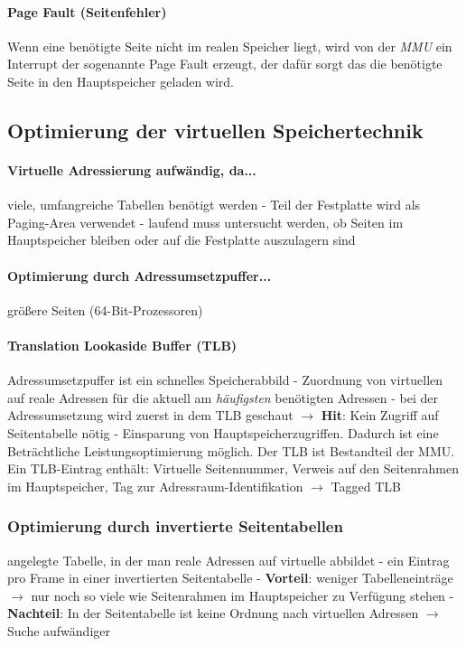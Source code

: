 \documentclass[11pt,a4paper,landscape]{article}
\begin{document}
\begin{multicols*}{3}
	\paragraph{Page Fault (Seitenfehler)} Wenn eine benötigte Seite nicht im realen Speicher liegt, wird von der \textit{MMU} ein Interrupt der sogenannte Page Fault erzeugt, der dafür sorgt das die benötigte Seite in den Hauptspeicher geladen wird.
	\subsection{Optimierung der virtuellen Speichertechnik}
	\paragraph{Virtuelle Adressierung aufwändig, da...} viele, umfangreiche Tabellen benötigt werden - Teil der Festplatte wird als Paging-Area verwendet - laufend muss untersucht werden, ob Seiten im Hauptspeicher bleiben oder auf die Festplatte auszulagern sind
	\paragraph{Optimierung durch Adressumsetzpuffer...} größere Seiten (64-Bit-Prozessoren)
	\paragraph{Translation Lookaside Buffer (TLB)} Adressumsetzpuffer ist ein schnelles Speicherabbild - Zuordnung von virtuellen auf reale Adressen für die aktuell am \textit{häufigsten} benötigten Adressen - bei der Adressumsetzung wird zuerst in dem TLB geschaut $\rightarrow$ \textbf{Hit}: Kein Zugriff auf Seitentabelle nötig - Einsparung von Hauptspeicherzugriffen. Dadurch ist eine Beträchtliche Leistungsoptimierung möglich. Der TLB ist Bestandteil der MMU. Ein TLB-Eintrag enthält: Virtuelle Seitennummer, Verweis auf den Seitenrahmen im Hauptspeicher, Tag zur Adressraum-Identifikation $\rightarrow$ Tagged TLB
	\subsubsection{Optimierung durch invertierte Seitentabellen}
	angelegte Tabelle, in der man reale Adressen auf virtuelle abbildet - ein Eintrag pro Frame in einer invertierten Seitentabelle - \textbf{Vorteil}: weniger Tabelleneinträge $\rightarrow$ nur noch so viele wie Seitenrahmen im Hauptspeicher zu Verfügung stehen - \textbf{Nachteil}: In der Seitentabelle ist keine Ordnung nach virtuellen Adressen $\rightarrow$ Suche aufwändiger

\end{multicols*}
\end{document}
